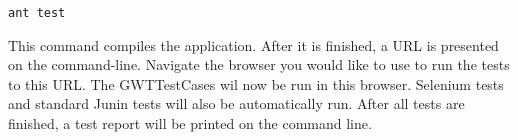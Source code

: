 \begin{verbatim}
ant test
\end{verbatim}

This command compiles the application. After it is finished, a URL is presented on the command-line. Navigate the browser you would like to use to run the tests to this URL. The GWTTestCases wil now be run in this browser. Selenium tests and standard Junin tests will also be automatically run. After all tests are finished, a test report will be printed on the command line.




